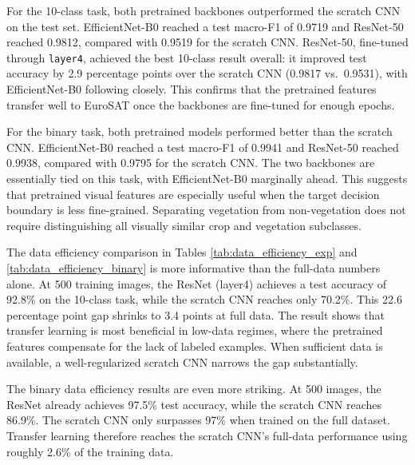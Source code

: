 For the 10-class task, both pretrained backbones outperformed the scratch CNN on
the test set. EfficientNet-B0 reached a test macro-F1 of 0.9719 and ResNet-50
reached 0.9812, compared with 0.9519 for the scratch CNN. ResNet-50, fine-tuned
through \texttt{layer4}, achieved the best 10-class result overall: it improved
test accuracy by 2.9 percentage points over the scratch CNN (0.9817 vs.\ 0.9531),
with EfficientNet-B0 following closely. This confirms that the pretrained features
transfer well to EuroSAT once the backbones are fine-tuned for enough epochs.

For the binary task, both pretrained models performed better than the scratch
CNN. EfficientNet-B0 reached a test macro-F1 of 0.9941 and ResNet-50 reached
0.9938, compared with 0.9795 for the scratch CNN. The two backbones are
essentially tied on this task, with EfficientNet-B0 marginally ahead. This
suggests that pretrained visual features are especially useful when the target
decision boundary is less fine-grained. Separating vegetation from non-vegetation does not require
distinguishing all visually similar crop and vegetation subclasses.

The data efficiency comparison in Tables \ref{tab:data_efficiency_exp} and
\ref{tab:data_efficiency_binary} is more informative than the full-data numbers
alone. At 500 training images, the ResNet (layer4) achieves a test accuracy of
92.8\% on the 10-class task, while the scratch CNN reaches only 70.2\%. This
22.6 percentage point gap shrinks to 3.4 points at full data. The result shows
that transfer learning is most beneficial in low-data regimes, where the
pretrained features compensate for the lack of labeled examples. When sufficient
data is available, a well-regularized scratch CNN narrows the gap substantially.

The binary data efficiency results are even more striking. At 500 images, the
ResNet already achieves 97.5\% test accuracy, while the scratch CNN reaches
86.9\%. The scratch CNN only surpasses 97\% when trained on the full dataset.
Transfer learning therefore reaches the scratch CNN's full-data performance using
roughly 2.6\% of the training data.

